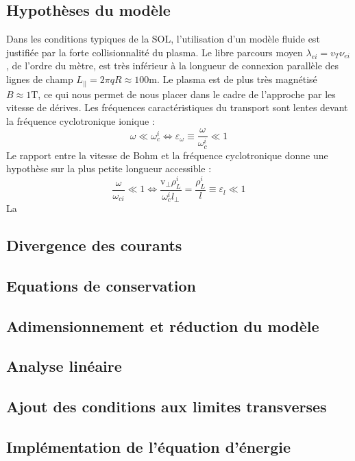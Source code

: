 		\subsection{Hypothèses du modèle}
Dans les conditions typiques de la SOL, l'utilisation d'un modèle fluide est justifiée par la
forte collisionnalité du plasma. Le libre
parcours moyen $\lambda_{ei}=v_T \nu_{ei}$, de l'ordre du mètre, est très inférieur à la longueur de connexion
parallèle des lignes de champ $L_{||}=2\pi q R\approx 100\text{m}$.
Le plasma est de plus très magnétisé $B\approx 1\text{T}$,
 ce qui nous permet de nous placer dans le cadre de
l'approche par les vitesse de dérives. Les fréquences caractéristiques
du transport sont lentes devant la fréquence cyclotronique ionique :
\begin{equation}
	\omega\ll\omega_c^i\Leftrightarrow \varepsilon_\omega\equiv\frac{\omega}{\omega_c^i}\ll 1
\end{equation}
Le rapport entre la vitesse de Bohm et la fréquence cyclotronique donne une hypothèse 
sur la plus petite longueur accessible :
\begin{equation}
	\frac{\omega}{\omega_{ci}}\ll 1 
	\Leftrightarrow \frac{\text{v}_\perp \rho_L^i}{\omega_c^i l_\perp}=\frac{\rho_L^i}{l}\equiv\varepsilon_l\ll 1
\end{equation}
La



		
		\subsection{Divergence des courants}
		\subsection{Equations de conservation}
		\subsection{Adimensionnement et réduction du modèle}
		\subsection{Analyse linéaire}
		\subsection{Ajout des conditions aux limites transverses}
		\subsection{Implémentation de l'équation d'énergie}

